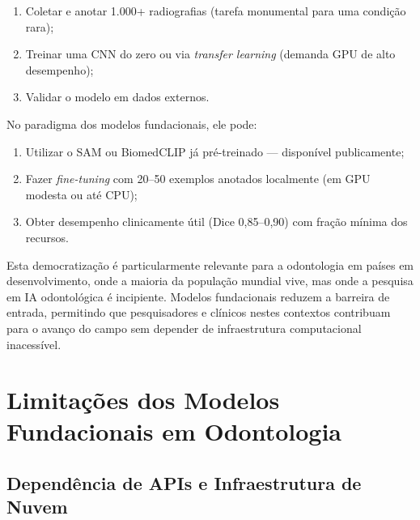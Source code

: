 \begin{enumerate}
    \item Coletar e anotar 1.000+ radiografias (tarefa monumental para uma condição rara);
    \item Treinar uma CNN do zero ou via \textit{transfer learning} (demanda GPU de alto desempenho);
    \item Validar o modelo em dados externos.
\end{enumerate}

No paradigma dos modelos fundacionais, ele pode:
\begin{enumerate}
    \item Utilizar o SAM ou BiomedCLIP já pré-treinado --- disponível publicamente;
    \item Fazer \textit{fine-tuning} com 20--50 exemplos anotados localmente (em GPU modesta ou até CPU);
    \item Obter desempenho clinicamente útil (Dice 0,85--0,90) com fração mínima dos recursos.
\end{enumerate}


Esta democratização é particularmente relevante para a odontologia em países em desenvolvimento, onde a maioria da população mundial vive, mas onde a pesquisa em IA odontológica é incipiente. Modelos fundacionais reduzem a barreira de entrada, permitindo que pesquisadores e clínicos nestes contextos contribuam para o avanço do campo sem depender de infraestrutura computacional inacessível.

\section{Limitações dos Modelos Fundacionais em Odontologia}

\subsection{Dependência de APIs e Infraestrutura de Nuvem}

